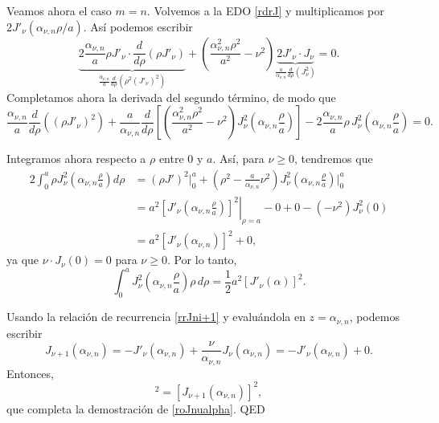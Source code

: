 \begin{scriptsize}
Veamos ahora el caso $m=n$. Volvemos a la EDO \eqref{rdrJ} y multiplicamos por $2J'_\nu(\alpha_{\nu,n}\rho/a)$. Así podemos escribir 
\begin{equation}
\underbrace{2\frac{\alpha_{\nu,n}}{a} \rho J'_\nu \cdot \frac{d}{d\rho} \left( \rho J'_\nu \right)}_{\displaystyle \frac{\alpha_{\nu,n}}{a}\frac{d}{d\rho} \left( \rho^2 (J'_\nu)^2 \right)} + \left( \frac{\alpha_{\nu,n}^2 \rho^2}{a^2} - \nu^2 \right) \underbrace{2J'_\nu \cdot J_\nu}_{\displaystyle \frac{a}{\alpha_{\nu,n}}\frac{d}{d\rho} \left( J_\nu^2 \right)} = 0.
\end{equation}
Completamos ahora la derivada del segundo término, de modo que
\begin{equation}
\frac{\alpha_{\nu,n}}{a}\frac{d}{d\rho} \left( \left( \rho J'_\nu\right)^2 \right) + \frac{a}{\alpha_{\nu,n}}\frac{d}{d\rho} \left[ \left( \frac{\alpha_{\nu,n}^2 \rho^2}{a^2} - \nu^2 \right) J_\nu^2\left(\alpha_{\nu,n} \frac{\rho}{a}\right) \right] - 2 \frac{\alpha_{\nu,n}}{a} \rho\, J_\nu^2\left(\alpha_{\nu,n} \frac{\rho}{a}\right) = 0.
\end{equation}

Integramos ahora respecto a $\rho$ entre $0$ y $a$. Así, para $\nu \ge 0$, tendremos que 
\begin{align}
2 \int_0^a \rho J_\nu^2\left(\alpha_{\nu,n} \frac{\rho}{a}\right) d\rho &= \left( \rho J' \right)^2 \Bigg|_0^a + \left(\rho^2 - \frac{a}{\alpha_{\nu,n}}\nu^2 \right) J_\nu^2\left(\alpha_{\nu,n} \frac{\rho}{a}\right) \Bigg|_0^a \\
 &= a^2 \left.\left[ J'_\nu \left( \alpha_{\nu,n} \frac{\rho}{a} \right) \right]^2\right|_{\rho=a} - 0 + 0 - (-\nu^2) J_\nu^2(0) \\
&= a^2 \left[ J'_\nu(\alpha_{\nu,n}) \right]^2 + 0,
\end{align}
ya que $\nu \cdot J_\nu(0) = 0$ para $\nu\ge 0$. Por lo tanto,
\begin{equation}
\int_0^a J_\nu^2\left(\alpha_{\nu,n} \frac{\rho}{a}\right)\rho\, d\rho = \frac{1}{2} a^2 [J'_\nu(\alpha)]^2.
\end{equation}

 Usando la relación de recurrencia \eqref{rrJni+1} y evaluándola en $z=\alpha_{\nu,n}$, podemos escribir
\begin{equation}
J_{\nu+1}(\alpha_{\nu,n}) = -J'_\nu(\alpha_{\nu,n}) + \frac{\nu}{\alpha_{\nu,n}}  J_\nu(\alpha_{\nu,n}) = -J'_\nu(\alpha_{\nu,n})  + 0.
\end{equation}
Entonces,
\begin{equation}
[J'_\nu(\alpha_{\nu,n})]^2 = [J_{\nu+1}(\alpha_{\nu,n})]^2,
\end{equation}
que completa la demostración de \eqref{roJnualpha}. QED
\end{scriptsize}


